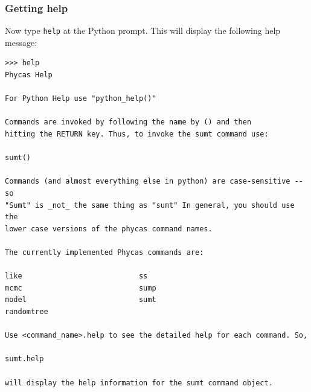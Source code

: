 \documentclass[10pt]{article}
\newcommand{\cmd}[1]{{\tt \small #1}\index{#1}}	%
\begin{document}
\subsubsection{Getting help}
Now type \cmd{help} at the Python prompt. This will display the following help message:
\begin{verbatim}
>>> help
Phycas Help
    
For Python Help use "python_help()"

Commands are invoked by following the name by () and then
hitting the RETURN key. Thus, to invoke the sumt command use:

sumt()

Commands (and almost everything else in python) are case-sensitive -- so
"Sumt" is _not_ the same thing as "sumt" In general, you should use the
lower case versions of the phycas command names.

The currently implemented Phycas commands are:
  
like                           ss
mcmc                           sump
model                          sumt
randomtree   
                  
Use <command_name>.help to see the detailed help for each command. So,

sumt.help

will display the help information for the sumt command object.
\end{verbatim}
\end{document}
